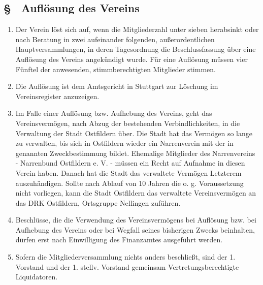 \subsection{§ \thesaparagraphcounter\ Auflösung des Vereins} \label{sa:par:aufloesung_verein}
\begin{enumerate}
    \item \label{sa:abs:4pnw2h} Der Verein löst sich auf, wenn die Mitgliederzahl unter sieben herabsinkt oder nach Beratung in zwei aufeinander folgenden, außerordentlichen Hauptversammlungen, in deren Tagesordnung die Beschlussfassung über eine Auflösung des Vereins angekündigt wurde. Für eine Auflösung müssen vier Fünftel der anwesenden, stimmberechtigten Mitglieder stimmen.

    \item \label{sa:abs:wf1bsi} Die Auflösung ist dem Amtsgericht in Stuttgart zur Löschung im Vereinsregister anzuzeigen.

    \item \label{sa:abs:vy9bpl} Im Falle einer Auflösung bzw. Aufhebung des Vereins, geht das Vereinsvermögen, nach Abzug der bestehenden Verbindlichkeiten, in die Verwaltung der Stadt Ostfildern über. Die Stadt hat das Vermögen so lange zu verwalten, bis sich in Ostfildern wieder ein Narrenverein mit der in  genannten Zweckbestimmung bildet. Ehemalige Mitglieder des Narrenvereins - Narrenbund Ostfildern e. V. - müssen ein Recht auf Aufnahme in diesen Verein haben. Danach hat die Stadt das verwaltete Vermögen Letzterem auszuhändigen. Sollte nach Ablauf von 10 Jahren die o. g. Voraussetzung nicht vorliegen, kann die Stadt Ostfildern das verwaltete Vereinsvermögen an das DRK Ostfildern, Ortsgruppe Nellingen zuführen.

    \item \label{sa:abs:11zhic} Beschlüsse, die die Verwendung des Vereinsvermögens bei Auflösung bzw. bei Aufhebung des Vereins oder bei Wegfall seines bisherigen Zwecks beinhalten, dürfen erst nach Einwilligung des Finanzamtes ausgeführt werden.

    \item \label{sa:abs:ryvp7z} Sofern die Mitgliederversammlung nichts anders beschließt, sind der 1. Vorstand und der 1. stellv. Vorstand gemeinsam Vertretungsberechtigte Liquidatoren.
\end{enumerate}

